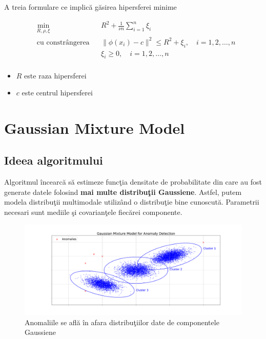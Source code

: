 A treia formulare ce implică găsirea hipersferei minime

    \begin{equation}
        \begin{aligned}
        & \underset{R, \rho, \xi}{\text{min}}
        & & R^2 + \frac{1}{\nu n} \sum_{i=1}^{n} \xi_i \\
        & \text{cu constrângerea}
        & & \|\phi(x_i) - c\|^2 \leq R^2 + \xi_i, \quad i=1,2,\ldots,n \\
        &&& \xi_i \geq 0, \quad i=1,2,\ldots,n \\
        \end{aligned}
        \end{equation}
        
        \begin{itemize}
        \item $R$ este raza hipersferei
        \item $c$ este centrul hipersferei
        \end{itemize}
        

\section{Gaussian Mixture Model}

\subsection{Ideea algoritmului}

Algoritmul încearcă să estimeze funcţia densitate de probabilitate 
din care au fost generate datele folosind 
\textbf{mai multe distribuţii Gaussiene}.
Astfel, putem modela distribuţii multimodale utilizând o distribuţie bine cunoscută.
Parametrii necesari sunt mediile şi covarianţele fiecărei componente.

\begin{figure}[H]
    \centering
    \includegraphics[width=\linewidth]{images/Anomaly-detection-with-Gaussian-mixture-models.pdf}
    \caption{Anomaliile se află în afara distribuţiilor date de componentele Gaussiene}
\end{figure}


